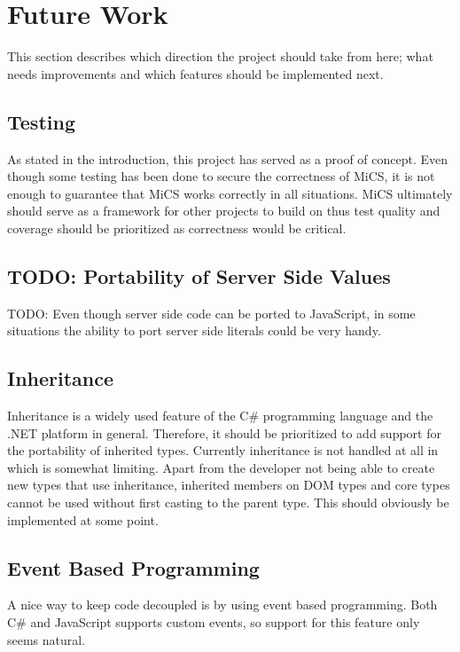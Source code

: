 
\section{Future Work}
\label{sec:futurework}
This section describes which direction the project should take from here; what needs improvements and which features should be implemented next.

\subsection{Testing} %
\label{sub:fw_testing}
	As stated in the introduction, this project has served as a proof of concept. Even though some testing has been done to secure the correctness of MiCS, it is not enough to guarantee that MiCS works correctly in all situations. MiCS ultimately should serve as a framework for other projects to build on thus test quality and coverage should be prioritized as correctness would be critical.

\subsection{TODO: Portability of Server Side Values} %
\label{sub:portability_of_server_side_values}
	TODO: Even though server side code can be ported to JavaScript, in some situations the ability to port server side literals could be very handy. 

\subsection{Inheritance} %
\label{sub:fw_inheritance}
	Inheritance is a widely used feature of the C\# programming language and the .NET platform in general. Therefore, it should be prioritized to add support for the portability of inherited types. Currently inheritance is not handled at all in which is somewhat limiting. Apart from the developer not being able to create new types that use inheritance, inherited members on DOM types and core types cannot be used without first casting to the parent type. This should obviously be implemented at some point.

\subsection{Event Based Programming} %
\label{sub:fw_event_based_programming}
	A nice way to keep code decoupled is by using event based programming. Both C\# and JavaScript supports custom events, so support for this feature only seems natural.

